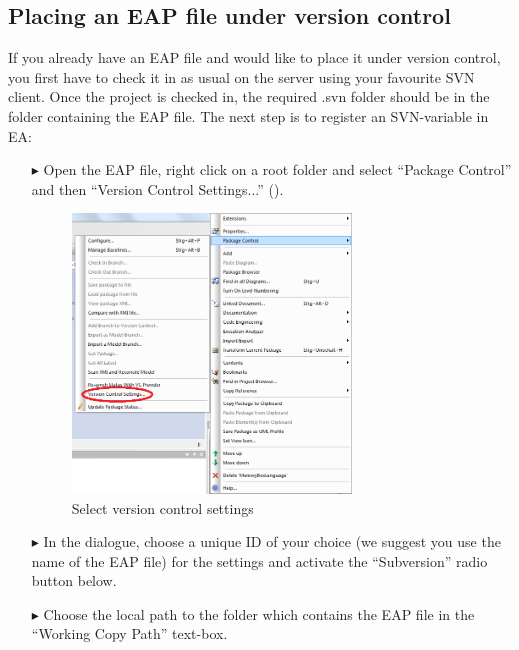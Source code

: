 \subsection{Placing an EAP file under version control}

If you already have an EAP file and would like to place it under version control, you first have to check it in as usual on the server using your favourite SVN
client. Once the project is checked in, the required .svn folder should be in the folder containing the EAP file. The next step is to register an SVN-variable
in EA:

\begin{enumerate}
  \item[$\blacktriangleright$] Open the EAP file, right click on a root folder and select ``Package Control'' and then ``Version Control Settings...''
  ().
  
\begin{figure}[!htbp]
\begin{center}
 	\includegraphics[width=0.7\textwidth]{rightclick}
	\caption{Select version control settings}
  	\label{fig:advanced-topics-eaSVN-rightclick}
\end{center}
\end{figure}

\newpage

  \item[$\blacktriangleright$] In the dialogue, choose a unique ID of your choice (we suggest you use the name of the EAP file) for the settings and activate
  the ``Subversion'' radio button below.
  
  \item[$\blacktriangleright$] Choose the local path to the folder which contains the EAP file in the ``Working Copy Path'' text-box.
  

\end{enumerate}
